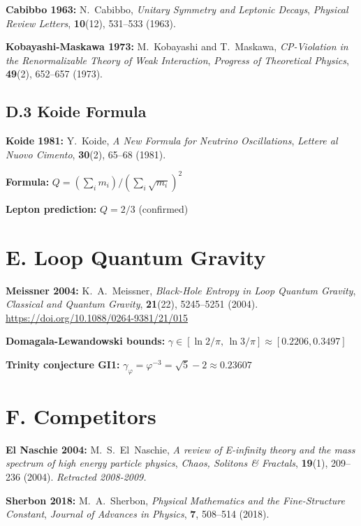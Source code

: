\documentclass[10pt,a4paper]{article}
\begin{document}
\noindent\textbf{Cabibbo 1963:} N.~Cabibbo, \textit{Unitary Symmetry and Leptonic Decays}, \textit{Physical Review Letters}, \textbf{10}(12), 531--533 (1963).

\noindent\textbf{Kobayashi-Maskawa 1973:} M.~Kobayashi and T.~Maskawa, \textit{CP-Violation in the Renormalizable Theory of Weak Interaction}, \textit{Progress of Theoretical Physics}, \textbf{49}(2), 652--657 (1973).

\subsection*{D.3 Koide Formula}

\noindent\textbf{Koide 1981:} Y.~Koide, \textit{A New Formula for Neutrino Oscillations}, \textit{Lettere al Nuovo Cimento}, \textbf{30}(2), 65--68 (1981).

\textbf{Formula:} $Q = (\sum_i m_i)/(\sum_i \sqrt{m_i})^2$

\textbf{Lepton prediction:} $Q = 2/3$ (confirmed)

\section*{E. Loop Quantum Gravity}

\noindent\textbf{Meissner 2004:} K.~A.~Meissner, \textit{Black-Hole Entropy in Loop Quantum Gravity}, \textit{Classical and Quantum Gravity}, \textbf{21}(22), 5245--5251 (2004). \url{https://doi.org/10.1088/0264-9381/21/015}

\textbf{Domagala-Lewandowski bounds:} $\gamma \in [\ln 2/\pi, \, \ln 3/\pi] \approx [0.2206, 0.3497]$

\textbf{Trinity conjecture GI1:} $\gamma_{\varphi} = \varphi^{-3} = \sqrt{5} - 2 \approx 0.23607$

\section*{F. Competitors}

\noindent\textbf{El Naschie 2004:} M.~S.~El~Naschie, \textit{A review of E-infinity theory and the mass spectrum of high energy particle physics}, \textit{Chaos, Solitons \& Fractals}, \textbf{19}(1), 209--236 (2004). \textit{Retracted 2008-2009.}

\noindent\textbf{Sherbon 2018:} M.~A.~Sherbon, \textit{Physical Mathematics and the Fine-Structure Constant}, \textit{Journal of Advances in Physics}, \textbf{7}, 508--514 (2018).
\end{document}
